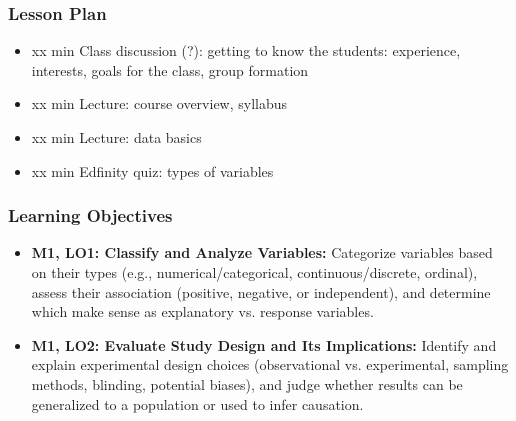 \begin{frame}
    \frametitle{Lesson Plan}
    \begin{itemize}
        \item xx min Class discussion (?): getting to know the students: experience, interests, goals for the class, group formation
        \item xx min Lecture: course overview, syllabus
        \item xx min Lecture: data basics
        \item xx min Edfinity quiz: types of variables
    \end{itemize}
\end{frame}
    
\begin{frame}
    \frametitle{Learning Objectives}
    \begin{itemize}
        \item \textbf{M1, LO1: Classify and Analyze Variables:} Categorize variables based on their types (e.g., numerical/categorical, continuous/discrete, ordinal), assess their association (positive, negative, or independent), and determine which make sense as explanatory vs. response variables.
        \item \textbf{M1, LO2: Evaluate Study Design and Its Implications:} Identify and explain experimental design choices (observational vs. experimental, sampling methods, blinding, potential biases), and judge whether results can be generalized to a population or used to infer causation. 
    \end{itemize}
\end{frame}


